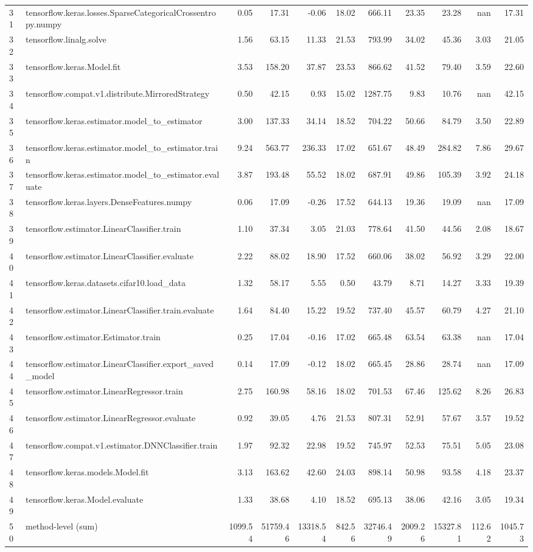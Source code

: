 \begin{tabular}{llrrrrrrrrr}
31 & tensorflow.keras.losses.SparseCategoricalCrossentropy.numpy & 0.05 & 17.31 & -0.06 & 18.02 & 666.11 & 23.35 & 23.28 & nan & 17.31 \\
32 & tensorflow.linalg.solve & 1.56 & 63.15 & 11.33 & 21.53 & 793.99 & 34.02 & 45.36 & 3.03 & 21.05 \\
33 & tensorflow.keras.Model.fit & 3.53 & 158.20 & 37.87 & 23.53 & 866.62 & 41.52 & 79.40 & 3.59 & 22.60 \\
34 & tensorflow.compat.v1.distribute.MirroredStrategy & 0.50 & 42.15 & 0.93 & 15.02 & 1287.75 & 9.83 & 10.76 & nan & 42.15 \\
35 & tensorflow.keras.estimator.model_to_estimator & 3.00 & 137.33 & 34.14 & 18.52 & 704.22 & 50.66 & 84.79 & 3.50 & 22.89 \\
36 & tensorflow.keras.estimator.model_to_estimator.train & 9.24 & 563.77 & 236.33 & 17.02 & 651.67 & 48.49 & 284.82 & 7.86 & 29.67 \\
37 & tensorflow.keras.estimator.model_to_estimator.evaluate & 3.87 & 193.48 & 55.52 & 18.02 & 687.91 & 49.86 & 105.39 & 3.92 & 24.18 \\
38 & tensorflow.keras.layers.DenseFeatures.numpy & 0.06 & 17.09 & -0.26 & 17.52 & 644.13 & 19.36 & 19.09 & nan & 17.09 \\
39 & tensorflow.estimator.LinearClassifier.train & 1.10 & 37.34 & 3.05 & 21.03 & 778.64 & 41.50 & 44.56 & 2.08 & 18.67 \\
40 & tensorflow.estimator.LinearClassifier.evaluate & 2.22 & 88.02 & 18.90 & 17.52 & 660.06 & 38.02 & 56.92 & 3.29 & 22.00 \\
41 & tensorflow.keras.datasets.cifar10.load_data & 1.32 & 58.17 & 5.55 & 0.50 & 43.79 & 8.71 & 14.27 & 3.33 & 19.39 \\
42 & tensorflow.estimator.LinearClassifier.train.evaluate & 1.64 & 84.40 & 15.22 & 19.52 & 737.40 & 45.57 & 60.79 & 4.27 & 21.10 \\
43 & tensorflow.estimator.Estimator.train & 0.25 & 17.04 & -0.16 & 17.02 & 665.48 & 63.54 & 63.38 & nan & 17.04 \\
44 & tensorflow.estimator.LinearClassifier.export_saved_model & 0.14 & 17.09 & -0.12 & 18.02 & 665.45 & 28.86 & 28.74 & nan & 17.09 \\
45 & tensorflow.estimator.LinearRegressor.train & 2.75 & 160.98 & 58.16 & 18.02 & 701.53 & 67.46 & 125.62 & 8.26 & 26.83 \\
46 & tensorflow.estimator.LinearRegressor.evaluate & 0.92 & 39.05 & 4.76 & 21.53 & 807.31 & 52.91 & 57.67 & 3.57 & 19.52 \\
47 & tensorflow.compat.v1.estimator.DNNClassifier.train & 1.97 & 92.32 & 22.98 & 19.52 & 745.97 & 52.53 & 75.51 & 5.05 & 23.08 \\
48 & tensorflow.keras.models.Model.fit & 3.13 & 163.62 & 42.60 & 24.03 & 898.14 & 50.98 & 93.58 & 4.18 & 23.37 \\
49 & tensorflow.keras.Model.evaluate & 1.33 & 38.68 & 4.10 & 18.52 & 695.13 & 38.06 & 42.16 & 3.05 & 19.34 \\
50 & method-level (sum) & 1099.54 & 51759.46 & 13318.54 & 842.56 & 32746.49 & 2009.26 & 15327.81 & 112.62 & 1045.73 \\
\end{tabular}
